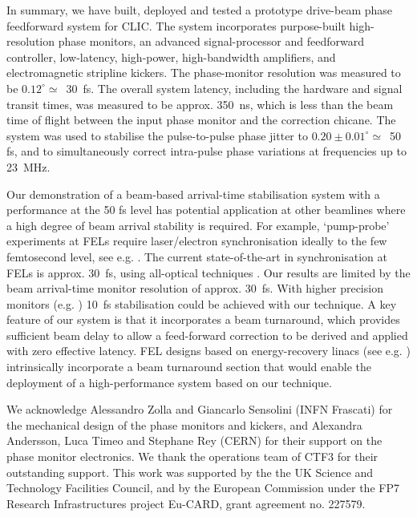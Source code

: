 \documentclass[%
 reprint,
 superscriptaddress,
 amsmath,
 amssymb,
 prl,
]{revtex4-1}
\begin{document}

In summary, we have built, deployed and tested a prototype drive-beam phase 
feedforward system for CLIC.   The system incorporates purpose-built 
high-resolution phase 
monitors, an advanced signal-processor and feedforward controller, low-latency, 
high-power, high-bandwidth amplifiers, and electromagnetic stripline
kickers. The phase-monitor resolution was measured to be 
\(0.12^\circ\simeq\)~30~fs.  The overall system latency, including the hardware 
and signal transit times, was measured to be approx. 350~ns, which is less than 
the beam time of flight between the input phase monitor and the correction 
chicane.
The system was used to 
stabilise the pulse-to-pulse phase jitter to \(0.20\pm0.01^\circ\simeq\)~50 fs, 
and to simultaneously correct intra-pulse phase variations at frequencies up to 
23~MHz.

Our demonstration of a beam-based arrival-time stabilisation system with a 
performance at the 50 fs level has potential application at other beamlines 
where a high degree of beam arrival stability is required.  For example, 
`pump-probe' experiments at FELs require laser/electron synchronisation ideally 
to the few femtosecond level, see e.g. \cite{Savelyev2017}. The current 
state-of-the-art in synchronisation at FELs is approx. 30~fs, using all-optical 
techniques \cite{FLASHnature}. Our results are limited by the beam arrival-time 
monitor resolution of approx. 30~fs. With higher precision monitors (e.g. 
\cite{flashPRL}) 10~fs stabilisation could be achieved with our technique. A 
key feature of our system is that it incorporates a beam turnaround, which 
provides sufficient beam delay to allow a feed-forward correction to be derived 
and applied with zero effective latency. FEL designs based on energy-recovery 
linacs (see e.g. \cite{Sekutowicz2005,Kwang2008,Jackson2016}) intrinsically 
incorporate a beam turnaround section that would enable the deployment of a 
high-performance system based on our technique.

\begin{acknowledgments}
	We acknowledge Alessandro Zolla and Giancarlo Sensolini (INFN 
	Frascati) for the mechanical design of the phase monitors and 
	kickers, and Alexandra Andersson, Luca Timeo and Stephane Rey (CERN) for 
	their support on the phase monitor electronics. We thank the 
	operations team of CTF3 for their outstanding support. This work was  
	supported by the the UK Science and Technology Facilities 
	Council, and by the European Commission under the FP7 Research 
	Infrastructures project Eu-CARD, grant agreement no. 227579.
\end{acknowledgments}
\end{document}
